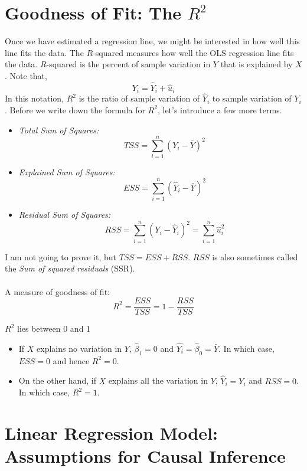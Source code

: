\documentclass{./../../Latex/handout}
\begin{document}
\section{Goodness of Fit: The $R^2$} 
Once we have estimated a regression line, we might be interested in how well this line fits the data. The $R$-squared measures how well the OLS regression line fits the data. 
$R$-squared is the percent of sample variation in $Y$ that is explained by $X$.
Note that,
$$ Y_i = \hat{Y}_i +  \hat{u}_i $$
In this notation, $R^2$ is the ratio of sample variation of $\hat{Y}_i$ to sample variation of $Y_i$. Before we write down the formula for $R^2$, let's introduce a few more terms.  
 \begin{itemize}
\item[]   \textit{Total Sum of Squares:} $$ \quad TSS = \sum_{i=1}^n (Y_i-\bar{Y})^2 $$
\item[]  \textit{Explained Sum of Squares:} $$ \quad ESS = \sum_{i=1}^n (\hat{Y}_i-\bar{Y})^2 $$
\item[]   \textit{Residual Sum of Squares:} $$ \quad RSS = \sum_{i=1}^n (Y_i-\hat{Y}_i)^2 =\sum_{i=1}^n \hat{u}_i^2$$
\end{itemize}
I am not going to prove it, but $TSS = ESS + RSS$. $RSS$ is also sometimes called the \textit{Sum of squared residuals} (SSR).  \\\\
A measure of goodness of fit: 
$$ R^2 = \frac{ESS}{TSS} = 1-\frac{RSS}{TSS} $$ 

 $R^2$ lies between 0 and 1
\begin{itemize}
  \item If $X$ explains no variation in $Y$, $\hat{\beta}_1=0$ and $ \hat{Y_i} = \hat{\beta}_0 = \bar{Y}$. In which case, $ESS=0$ and hence $R^2=0$.
  \item On the other hand, if $X$ explains all the variation in $Y$, $\hat{Y}_i=Y_i$ and $RSS=0$. In which case, $R^2=1$.
\end{itemize}

\section{Linear Regression Model: Assumptions for Causal Inference}
\end{document}
